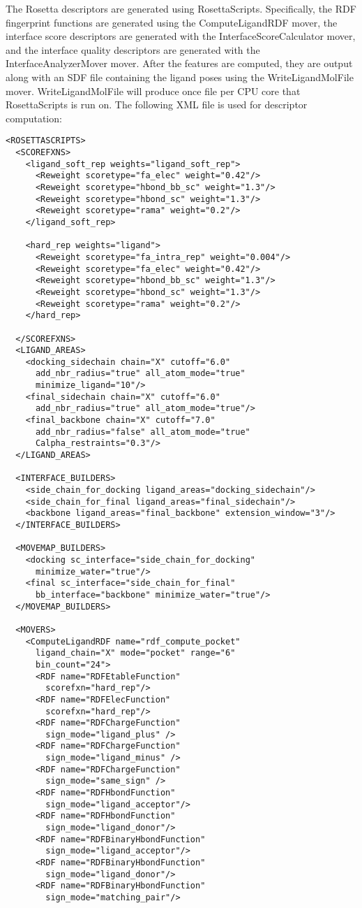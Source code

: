 The Rosetta descriptors are generated using RosettaScripts.
Specifically, the RDF fingerprint functions are generated using the ComputeLigandRDF mover, the interface score descriptors are generated with the InterfaceScoreCalculator mover, and the interface quality descriptors are generated with the InterfaceAnalyzerMover mover. 
After the features are computed, they are output along with an SDF file containing the ligand poses using the WriteLigandMolFile mover.
WriteLigandMolFile will produce once file per CPU core that RosettaScripts is run on.
The following XML file is used for descriptor computation:
\singlespace
\begin{verbatim}
<ROSETTASCRIPTS>
  <SCOREFXNS>
    <ligand_soft_rep weights="ligand_soft_rep">
      <Reweight scoretype="fa_elec" weight="0.42"/>
      <Reweight scoretype="hbond_bb_sc" weight="1.3"/>
      <Reweight scoretype="hbond_sc" weight="1.3"/>
      <Reweight scoretype="rama" weight="0.2"/>
    </ligand_soft_rep>
  
    <hard_rep weights="ligand">
      <Reweight scoretype="fa_intra_rep" weight="0.004"/>
      <Reweight scoretype="fa_elec" weight="0.42"/>
      <Reweight scoretype="hbond_bb_sc" weight="1.3"/>
      <Reweight scoretype="hbond_sc" weight="1.3"/>
      <Reweight scoretype="rama" weight="0.2"/>
    </hard_rep>
    
  </SCOREFXNS>
  <LIGAND_AREAS>
    <docking_sidechain chain="X" cutoff="6.0"
      add_nbr_radius="true" all_atom_mode="true"
      minimize_ligand="10"/>
    <final_sidechain chain="X" cutoff="6.0"
      add_nbr_radius="true" all_atom_mode="true"/>
    <final_backbone chain="X" cutoff="7.0"
      add_nbr_radius="false" all_atom_mode="true" 
      Calpha_restraints="0.3"/>
  </LIGAND_AREAS>
  
  <INTERFACE_BUILDERS>
    <side_chain_for_docking ligand_areas="docking_sidechain"/>
    <side_chain_for_final ligand_areas="final_sidechain"/>
    <backbone ligand_areas="final_backbone" extension_window="3"/>
  </INTERFACE_BUILDERS>
  
  <MOVEMAP_BUILDERS>
    <docking sc_interface="side_chain_for_docking"
      minimize_water="true"/>
    <final sc_interface="side_chain_for_final"
      bb_interface="backbone" minimize_water="true"/>
  </MOVEMAP_BUILDERS>
  
  <MOVERS>
    <ComputeLigandRDF name="rdf_compute_pocket" 
      ligand_chain="X" mode="pocket" range="6"
      bin_count="24">
      <RDF name="RDFEtableFunction"
        scorefxn="hard_rep"/>
      <RDF name="RDFElecFunction"
        scorefxn="hard_rep"/>
      <RDF name="RDFChargeFunction"
        sign_mode="ligand_plus" />
      <RDF name="RDFChargeFunction"
        sign_mode="ligand_minus" />
      <RDF name="RDFChargeFunction"
        sign_mode="same_sign" />
      <RDF name="RDFHbondFunction"
        sign_mode="ligand_acceptor"/>
      <RDF name="RDFHbondFunction"
        sign_mode="ligand_donor"/> 
      <RDF name="RDFBinaryHbondFunction"
        sign_mode="ligand_acceptor"/>
      <RDF name="RDFBinaryHbondFunction"
        sign_mode="ligand_donor"/>
      <RDF name="RDFBinaryHbondFunction"
        sign_mode="matching_pair"/>      


\end{verbatim}
